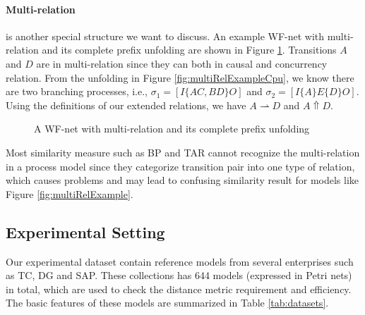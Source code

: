 \documentclass[dvips,...]{llncs}
\begin{document}
\paragraph{Multi-relation} is another special structure we want to discuss. An example WF-net with multi-relation and its complete prefix unfolding are shown in Figure \ref{fig:exampleMultiRelation}. Transitions $A$ and $D$ are in multi-relation since they can both in causal and concurrency relation. From the unfolding in Figure \ref{fig:multiRelExampleCpu}, we know there are two branching processes, i.e., $\sigma_{1}=[I\{AC,BD\}O]$ and $\sigma_{2}=[I\{A\}E\{D\}O]$. Using the definitions of our extended relations, we have $A\rightharpoonup D$ and $A\Uparrow D$.

\begin{figure}[htbp]
\centering
{}
\caption{A WF-net with multi-relation and its complete prefix unfolding\label{fig:exampleMultiRelation}}
\end{figure}

Most similarity measure such as BP and TAR cannot recognize the multi-relation in a process model since they categorize transition pair into one type of relation, which causes problems and may lead to confusing similarity result for models like Figure \ref{fig:multiRelExample}.

\subsection{Experimental Setting}\label{subsec:setting}
Our experimental dataset contain reference models from several enterprises such as TC, DG and SAP. These collections has 644 models (expressed in Petri nets) in total, which are used to check the distance metric requirement and efficiency. The basic features of these models are summarized in Table \ref{tab:datasets}.
\end{document}
